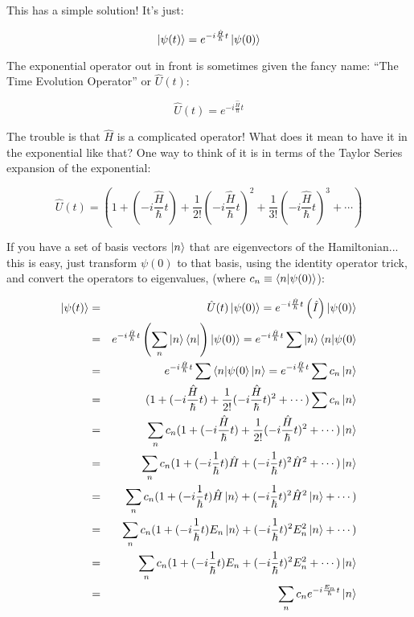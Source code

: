 \documentclass[11pt]{article} %
\begin{document}
This has a simple solution! It's just:

\begin{equation}
\ket{\psi(t)} = e^{-i\frac{\hat{H}}{\hbar} t} \ket{\psi(0)}
\end{equation}

The exponential operator out in front is sometimes given the fancy name: ``The Time Evolution Operator'' or $\hat{U}(t)$:

\begin{equation}
\hat{U}(t) = e^{-i\frac{\hat{H}}{\hbar} t}
\end{equation}

The trouble is that $\hat{H}$ is a complicated operator! What does it mean to have it in the exponential like that? One way to think of it is in terms of the Taylor Series expansion of the exponential:

\begin{equation}
\hat{U}(t) = (1 + \left(-i\frac{\hat{H}}{\hbar} t\right) + \frac{1}{2!}\left(-i\frac{\hat{H}}{\hbar} t\right)^2 + \frac{1}{3!}\left(-i\frac{\hat{H}}{\hbar} t\right)^3 + \cdots )
\label{eq:TEO}
\end{equation}

If you have a set of basis vectors $\ket{n}$ that are eigenvectors of the Hamiltonian... this is easy, just transform $\psi(0)$ to that basis, using the identity operator trick, and convert the operators to eigenvalues, (where $c_n \equiv \braket{n|\psi(0)}$):


\begin{eqnarray}
\ket{\psi(t)} &=& \hat{U}(t)\ket{\psi(0)} = e^{-i\frac{\hat{H}}{\hbar} t} \left(\hat{I}\right) \ket{\psi(0)}\\
              &=& e^{-i\frac{\hat{H}}{\hbar} t} \left(\sum_n \ket{n}\bra{n}\right)\ket{\psi(0)} =e^{-i\frac{\hat{H}}{\hbar} t}\sum \ket{n}\braket{n|\psi(0}\\
              &=& e^{-i\frac{\hat{H}}{\hbar} t}\sum \braket{n|\psi(0} \ket{n} = e^{-i\frac{\hat{H}}{\hbar} t}\sum c_n \ket{n}\\
              &=& (1 + (-i\frac{\hat{H}}{\hbar} t) + \frac{1}{2!}(-i\frac{\hat{H}}{\hbar} t)^2 + \cdots )\sum c_n \ket{n}\\
              &=& \sum_n c_n(1 + (-i\frac{\hat{H}}{\hbar} t) + \frac{1}{2!}(-i\frac{\hat{H}}{\hbar} t)^2 + \cdots )\ket{n}\\
              &=& \sum_n c_n(1 + (-i\frac{1}{\hbar} t)\hat{H} + (-i\frac{1}{\hbar} t)^2\hat{H}^2 + \cdots )\ket{n}\\
              &=& \sum_n c_n(1 + (-i\frac{1}{\hbar} t)\hat{H}\ket{n} + (-i\frac{1}{\hbar} t)^2\hat{H}^2\ket{n} + \cdots )\\
              &=& \sum_n c_n(1 + (-i\frac{1}{\hbar} t) E_n\ket{n} + (-i\frac{1}{\hbar} t)^2 E_n^2\ket{n} + \cdots )\\
              &=& \sum_n c_n(1 + (-i\frac{1}{\hbar} t) E_n + (-i\frac{1}{\hbar} t)^2 E_n^2 + \cdots )\ket{n}\\
              &=& \sum_n c_n e^{-i\frac{E_n}{\hbar}t}\ket{n}
\end{eqnarray}
\end{document}
